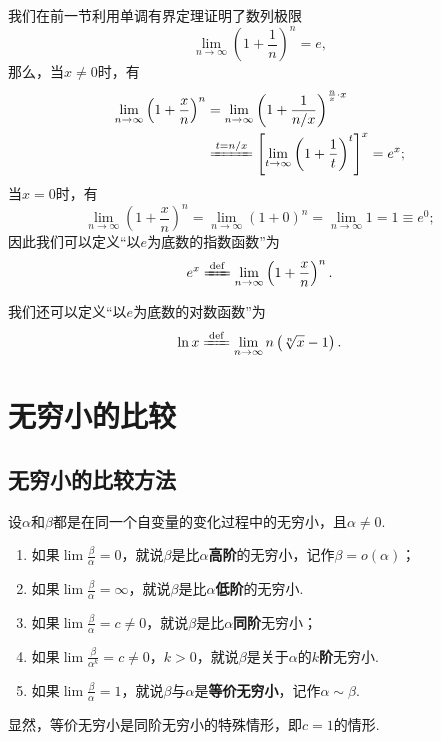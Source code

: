 我们在前一节利用单调有界定理证明了数列极限\[
\lim\limits_{n\to\infty} \left(1+\frac{1}{n}\right)^n = e,
\]
那么，当\(x\neq0\)时，有
\begin{align*}
\lim\limits_{n\to\infty} \left(1+\frac{x}{n}\right)^n
&= \lim\limits_{n\to\infty} \left(1+\frac{1}{n/x}\right)^{\frac{n}{x} \cdot x} \\
&\xlongequal{t=n/x} \left[ \lim\limits_{t\to\infty} \left(1+\frac{1}{t}\right)^t \right]^x
= e^x;
\end{align*}
当\(x=0\)时，有\[
\lim\limits_{n\to\infty} \left(1+\frac{x}{n}\right)^n
= \lim\limits_{n\to\infty} (1+0)^n
= \lim\limits_{n\to\infty} 1
= 1 \equiv e^0;
\]
因此我们可以定义“以\(e\)为底数的指数函数”为
\begin{equation}\label{equation:特殊函数.以e为底数的指数函数的极限定义}
e^x
\defeq
\lim\limits_{n\to\infty} \left(1+\frac{x}{n}\right)^n.
\end{equation}

我们还可以定义“以\(e\)为底数的对数函数”为
\begin{equation}\label{equation:特殊函数.以e为底数的对数函数的极限定义}
\ln x
\defeq
\lim\limits_{n\to\infty} n \left( \sqrt[n]{x} - 1 \right).
\end{equation}

\section{无穷小的比较}
\subsection{无穷小的比较方法}
\begin{definition}
\newcommand{\lf}[1][]{\lim \frac{\beta}{\alpha^{#1}}}
设\(\alpha\)和\(\beta\)都是在同一个自变量的变化过程中的无穷小，且\(\alpha\neq0\).
\begin{enumerate}
\item 如果\(\lf=0\)，就说\(\beta\)是比\(\alpha\)\textbf{高阶}的无穷小，记作\(\beta=o(\alpha)\)；
\item 如果\(\lf=\infty\)，就说\(\beta\)是比\(\alpha\)\textbf{低阶}的无穷小.
\item 如果\(\lf=c\neq0\)，就说\(\beta\)是比\(\alpha\)\textbf{同阶}无穷小；
\item 如果\(\lf[k]=c\neq0\)，\(k>0\)，就说\(\beta\)是关于\(\alpha\)的\(k\)\textbf{阶}无穷小.
\item 如果\(\lf=1\)，就说\(\beta\)与\(\alpha\)是\textbf{等价无穷小}，记作\(\alpha\sim\beta\).
\end{enumerate}
\end{definition}
显然，等价无穷小是同阶无穷小的特殊情形，即\(c=1\)的情形.

